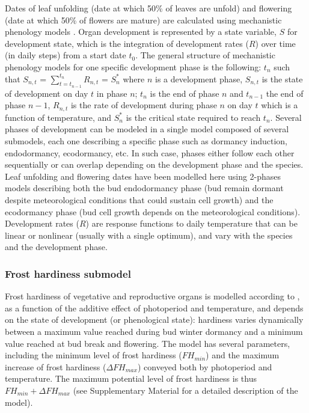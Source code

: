\documentclass[preprint,12pt,authoryear]{elsarticle}
\begin{document}
Dates of leaf unfolding (date at which 50\% of leaves are unfold) and flowering (date at which 50\% of flowers are mature) are calculated using mechanistic phenology models \citep{Chuine2017}. Organ development is represented by a state variable, $S$ for development state, which is the integration of development rates ($R$) over time (in daily steps) from a start date $t_0$. The general structure of mechanistic phenology models for one specific development phase is the following:
$t_n$ such that $S_{n,t}$ = $\sum_{t=t_{n-1}}^{t_n} R_{n,t}$ = $S_n^*$ 
where $n$ is a development phase, $S_{n,t}$ is the state of development on day $t$ in phase $n$; $t_n$ is the end of phase $n$ and  $t_{n-1}$ the end of phase ${n-1}$, $R_{n,t}$ is the rate of development during phase $n$ on day $t$ which is a function of  temperature, and $S_n^*$ is the critical state required to reach $t_n$.  Several phases of development can be modeled in a single model composed of several submodels, each one describing a specific phase such as dormancy induction, endodormancy, ecodormancy, etc. In such case, phases either follow each other sequentially or can overlap depending on the development phase and the species. Leaf unfolding and flowering dates have been modelled here using 2-phases models describing both the bud endodormancy phase (bud remain dormant despite meteorological conditions that could sustain cell growth) and the ecodormancy phase (bud cell growth depends on the meteorological conditions).  Development rates ($R$) are response functions to daily temperature that can be linear or nonlinear (usually with a single optimum), and vary with the species and the development phase. 

\subsubsection{Frost hardiness submodel}

Frost hardiness of vegetative and reproductive organs is modelled according to \citet{Leinonen1996}, as a function of the additive effect of photoperiod and temperature, and depends on the state of development (or phenological state): hardiness varies dynamically between a maximum value reached during bud winter dormancy and a minimum value reached at bud break and flowering. The model has several parameters, including the minimum level of frost hardiness ($FH_{min}$) and the maximum increase of frost hardiness ($\Delta FH_{max}$) conveyed both by photoperiod and temperature. The maximum potential level of frost hardiness is thus $FH_{min}+\Delta FH_{max}$ (see Supplementary Material for a detailed description of the model). 
\end{document}
